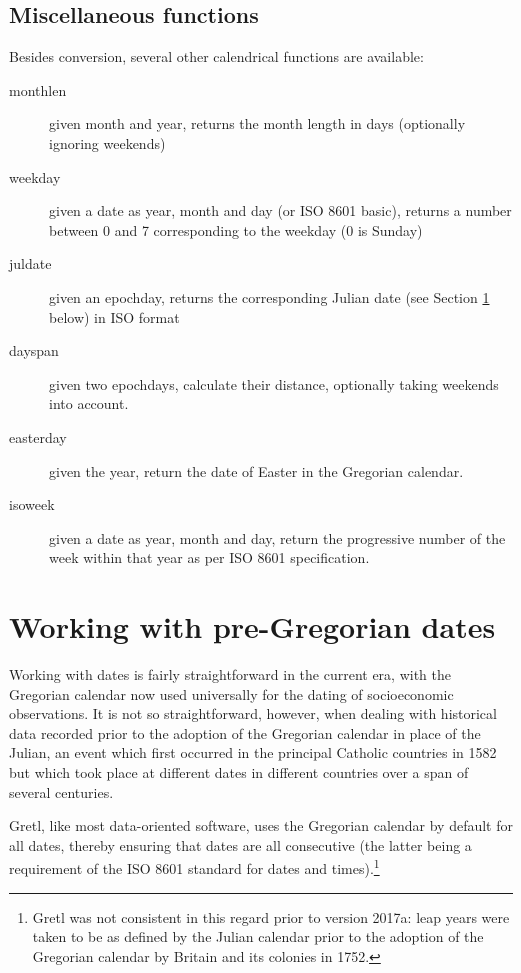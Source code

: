 \subsection{Miscellaneous functions}
\label{sec:cal-misc}

Besides conversion, several other calendrical functions are available:
\begin{description}
\item[monthlen] given month and year, returns the month length in days
  (optionally ignoring weekends)
\item[weekday] given a date as year, month and day (or ISO 8601
  basic), returns a number between 0 and 7 corresponding to the weekday
  (0 is Sunday)
\item[juldate] given an epochday, returns the corresponding Julian
  date (see Section \ref{sec:cal-conversion} below) in ISO format
\item[dayspan] given two epochdays, calculate their distance,
  optionally taking weekends into account.
\item[easterday] given the year, return the date of Easter in the
  Gregorian calendar.
\item[isoweek] given a date as year, month and day, return the
  progressive number of the week within that year as per ISO 8601
  specification.
\end{description}


\section{Working with pre-Gregorian dates}
\label{sec:cal-conversion}

Working with dates is fairly straightforward in the current era, with
the Gregorian calendar now used universally for the dating of
socioeconomic observations. It is not so straightforward, however,
when dealing with historical data recorded prior to the adoption of
the Gregorian calendar in place of the Julian, an event which first
occurred in the principal Catholic countries in 1582 but which took
place at different dates in different countries over a span of several
centuries.

Gretl, like most data-oriented software, uses the Gregorian calendar
by default for all dates, thereby ensuring that dates are all
consecutive (the latter being a requirement of the ISO 8601 standard
for dates and times).\footnote{Gretl was not consistent in this regard
  prior to version 2017a: leap years were taken to be as defined by
  the Julian calendar prior to the adoption of the Gregorian calendar
  by Britain and its colonies in 1752.}

